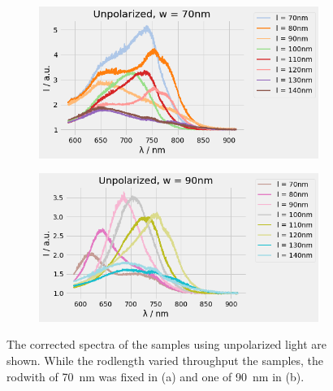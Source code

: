 \begin{figure}
    \centering
    \begin{subfigure}{\textwidth}
        \includegraphics[width=\textwidth]{Bilder/Auswertung/SpektrumUnpol70.png}
        \caption{ }
        \label{fig:u70}
    \end{subfigure}
    \hfill
    \begin{subfigure}{\textwidth}
        \includegraphics[width=\textwidth]{Bilder/Auswertung/SpektrumUnpol90.png}
        \caption{ }
        \label{fig:u90}
    \end{subfigure}
    \caption{The corrected spectra of the samples using unpolarized light are shown. While the rodlength varied throughput the samples, the rodwith of \SI{70}{\nano\meter} was fixed in (a) and one of \SI{90}{\nano\meter} in (b).}
    \label{fig:unpol}
\end{figure}

